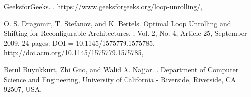 \documentclass[a4paper,twocolumn]{article}
\begin{document}
\begin{thebibliography}{99} %

    GeeksforGeeks.
    .
    \newblock \url{https://www.geeksforgeeks.org/loop-unrolling/}, \newblock [online]
    
    O. S. Dragomir, T. Stefanov, and K. Bertels.
    \newblock Optimal Loop Unrolling and Shifting for Reconfigurable Architectures.
    , Vol. 2, No. 4, Article 25, September 2009, 24 pages.
    \newblock DOI = 10.1145/1575779.1575785.
    \newblock \url{http://doi.acm.org/10.1145/1575779.1575785}, \newblock [online]

    Betul Buyukkurt, Zhi Guo, and Walid A. Najjar.
    .
    \newblock Department of Computer Science and Engineering, University of California - Riverside, Riverside, CA 92507, USA.
    
\end{thebibliography}


	
	
\end{document}
